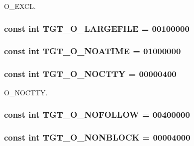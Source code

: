 O\_\-EXCL. \hypertarget{classX86Linux64_a9600e092a6309f94d92129ce5f85b945}{
\subsubsection[{TGT\_\-O\_\-LARGEFILE}]{\setlength{\rightskip}{0pt plus 5cm}const int {\bf TGT\_\-O\_\-LARGEFILE} = 00100000}}
\label{classX86Linux64_a9600e092a6309f94d92129ce5f85b945}
\hypertarget{classX86Linux64_a0ee8b0c23c2babc48e978e872b03c82c}{
\subsubsection[{TGT\_\-O\_\-NOATIME}]{\setlength{\rightskip}{0pt plus 5cm}const int {\bf TGT\_\-O\_\-NOATIME} = 01000000}}
\label{classX86Linux64_a0ee8b0c23c2babc48e978e872b03c82c}
\hypertarget{classX86Linux64_adfd4240281579e5f60c5e22c601225d8}{
\subsubsection[{TGT\_\-O\_\-NOCTTY}]{\setlength{\rightskip}{0pt plus 5cm}const int {\bf TGT\_\-O\_\-NOCTTY} = 00000400}}
\label{classX86Linux64_adfd4240281579e5f60c5e22c601225d8}


O\_\-NOCTTY. \hypertarget{classX86Linux64_a9c27f68ab31ddfdd3e35800ea1f02a89}{
\subsubsection[{TGT\_\-O\_\-NOFOLLOW}]{\setlength{\rightskip}{0pt plus 5cm}const int {\bf TGT\_\-O\_\-NOFOLLOW} = 00400000}}
\label{classX86Linux64_a9c27f68ab31ddfdd3e35800ea1f02a89}
\hypertarget{classX86Linux64_a0ea5420b4c9b45ba342a266fb77ac942}{
\subsubsection[{TGT\_\-O\_\-NONBLOCK}]{\setlength{\rightskip}{0pt plus 5cm}const int {\bf TGT\_\-O\_\-NONBLOCK} = 00004000}}
\label{classX86Linux64_a0ea5420b4c9b45ba342a266fb77ac942}


